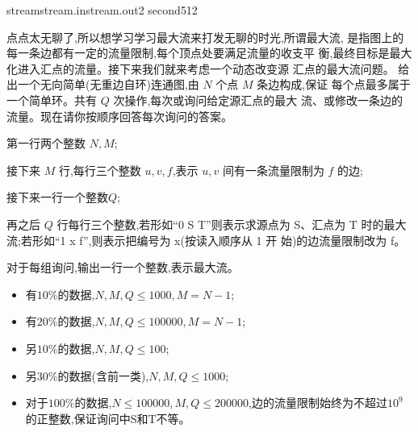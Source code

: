 \documentclass[11pt,a4paper,oneside]{article}
\begin{document}
\begin{problem}{stream}{stream.in}{stream.out}{2 second}{512}
	
	点点太无聊了,所以想学习学习最大流来打发无聊的时光,所谓最大流,
	是指图上的每一条边都有一定的流量限制,每个顶点处要满足流量的收支平
	衡,最终目标是最大化进入汇点的流量。接下来我们就来考虑一个动态改变源
	汇点的最大流问题。
	给出一个无向简单(无重边自环)连通图,由 $N$ 个点 $M$ 条边构成,保证
	每个点最多属于一个简单环。共有 $Q$ 次操作,每次或询问给定源汇点的最大
	流、或修改一条边的流量。现在请你按顺序回答每次询问的答案。
	
	\InputFile
	
	第一行两个整数 $N,M$;
	
	接下来 $M$ 行,每行三个整数 $u,v,f$,表示 $u,v$ 间有一条流量限制为 $f$
	的边;
	
	接下来一行一个整数$Q$;
	
	再之后 $Q$ 行每行三个整数,若形如“0 S T”则表示求源点为 S、汇点为
	T 时的最大流;若形如“1 x f”,则表示把编号为 x(按读入顺序从 1 开
	始)的边流量限制改为 f。
	
	\OutputFile
	
	对于每组询问,输出一行一个整数,表示最大流。
	
	\Example
	
	\begin{example}
	\end{example}

	\Note
	\begin{itemize}
		\item 有$10\%$的数据,$N,M,Q \leq 1000,M=N-1$;
		\item 有$20\%$的数据,$N,M,Q \leq 100000,M=N-1$;
		\item 另$10\%$的数据,$N,M,Q \leq 100$;
		\item 另$30\%$的数据(含前一类),$N,M,Q \leq 1000$;
		\item 对于$100\%$的数据,$N \leq 100000,M,Q \leq 200000$,边的流量限制始终为不超过$10^9$的正整数,保证询问中S和T不等。
	\end{itemize}
\end{problem}
\end{document}
